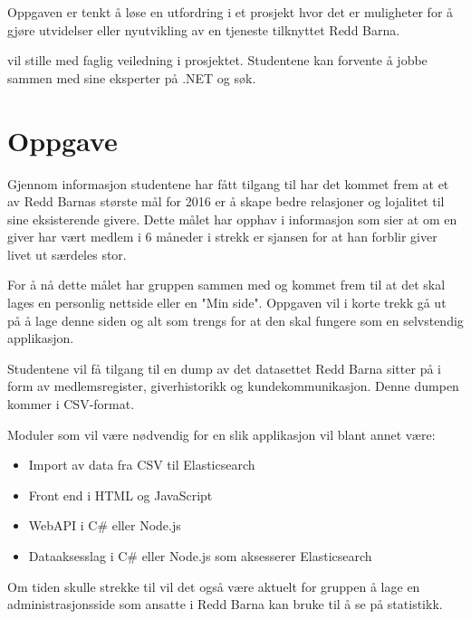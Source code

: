 Oppgaven er tenkt å løse en utfordring i et prosjekt hvor det er muligheter for å gjøre utvidelser eller nyutvikling av en tjeneste tilknyttet Redd Barna.

\mw{} vil stille med faglig veiledning i prosjektet. Studentene kan forvente å jobbe sammen med \mw{} sine eksperter på .NET og søk.

\section{Oppgave}
Gjennom informasjon studentene har fått tilgang til har det kommet frem at et av Redd Barnas største mål for 2016 er å skape bedre relasjoner og lojalitet til sine eksisterende givere. Dette målet har opphav i informasjon som sier at om en giver har vært medlem i 6 måneder i strekk er sjansen for at han forblir giver livet ut særdeles stor.

For å nå dette målet har gruppen sammen med \mw{} og \rb{} kommet frem til at det skal lages en personlig nettside eller en "Min side". Oppgaven vil i korte trekk gå ut på å lage denne siden og alt som trengs for at den skal fungere som en selvstendig applikasjon.

Studentene vil få tilgang til en dump av det datasettet Redd Barna sitter på i form av medlemsregister, giverhistorikk og kundekommunikasjon. Denne dumpen kommer i CSV-format.

Moduler som vil være nødvendig for en slik applikasjon vil blant annet være:
\begin{itemize}
\item Import av data fra CSV til Elasticsearch
\item Front end i HTML og JavaScript
\item WebAPI i C\# eller Node.js
\item Dataaksesslag i C\# eller Node.js som aksesserer Elasticsearch
\end{itemize}

Om tiden skulle strekke til vil det også være aktuelt for gruppen å lage en administrasjonsside som ansatte i Redd Barna kan bruke til å se på statistikk.